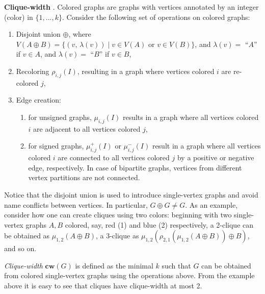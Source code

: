 
\noindent
\textbf{Clique-width} \cite{DBLP:journals/dam/FischerMR08}.
Colored graphs are graphs with vertices annotated by an integer (color) in $\{1,...,k\}$.
Consider the following set of operations on colored graphs:
\begin{enumerate}
	\item Disjoint union $\oplus$, where $V(A \oplus B)=\{ (v,\, \lambda(v)) \; | \; v \in V(A) \text{ or } v\in V(B) \}$, and $\lambda(v)=$ ``$A$'' if $v\in A$, and $\lambda(v)=$ ``$B$'' if $v\in B$,
	\item Recoloring $\rho_{i,j}(I)$, resulting in a graph where vertices colored $i$ are re-colored $j$,
	\item Edge creation:
	\begin{enumerate}
		\item for unsigned graphs, $\mu_{i,j}(I)$ results in a graph where all vertices colored $i$ are adjacent to all vertices colored $j$,
		\item for signed graphs, $\mu_{i,j}^+(I)$ or $\mu_{i,j}^-(I)$ result in a graph where all vertices colored $i$ are connected to all vertices colored $j$ by a positive or negative edge, respectively. In case of bipartite graphs, vertices from different vertex partitions are not connected.
	\end{enumerate}
\end{enumerate}

\noindent
Notice that the disjoint union is used to introduce single-vertex graphs and avoid name conflicts between vertices.
In particular, $G \oplus G \neq G$.
As an example, consider how one can create cliques using two colors: beginning with two single-vertex graphs $A, B$ colored, say, red (1) and blue (2) respectively, a 2-clique can be obtained as $\mu_{1,2}(A \oplus B)$, a 3-clique as $\mu_{1,2}(\rho_{2,1}(\mu_{1,2}(A \oplus B)) \oplus B)$, and so on.

{\em Clique-width} $\textbf{cw}(G)$ is defined as the minimal $k$ such that $G$ can be obtained from colored single-vertex graphs using the operations above.
From the example above it is easy to see that cliques have clique-width at most 2.\\

